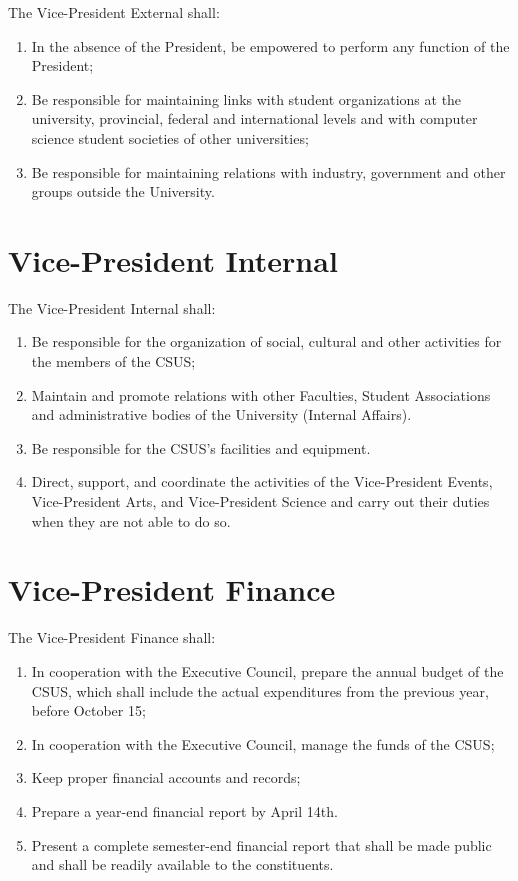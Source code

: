 The Vice-President External shall:

\begin{enumerate}
\def\labelenumi{\arabic{enumi}.}
\item
  In the absence of the President, be empowered to perform any function
  of the President;
\item
  Be responsible for maintaining links with student organizations at the
  university, provincial, federal and international levels and with
  computer science student societies of other universities;
\item
  Be responsible for maintaining relations with industry, government and
  other groups outside the University.
\end{enumerate}

\section{Vice-President
Internal}\label{vice-president-internal}

The Vice-President Internal shall:

\begin{enumerate}
\def\labelenumi{\arabic{enumi}.}
\item
  Be responsible for the organization of social, cultural and other
  activities for the members of the CSUS;
\item
  Maintain and promote relations with other Faculties, Student
  Associations and administrative bodies of the University (Internal
  Affairs).
\item
  Be responsible for the CSUS's facilities and equipment.
\item
  Direct, support, and coordinate the activities of the Vice-President
  Events, Vice-President Arts, and Vice-President Science and carry out
  their duties when they are not able to do so.
\end{enumerate}

\section{Vice-President Finance}\label{vice-president-finance}

The Vice-President Finance shall:

\begin{enumerate}
\def\labelenumi{\arabic{enumi}.}
\item
  In cooperation with the Executive Council, prepare the annual budget
  of the CSUS, which shall include the actual expenditures from the
  previous year, before October 15;
\item
  In cooperation with the Executive Council, manage the funds of the
  CSUS;
\item
  Keep proper financial accounts and records;
\item
  Prepare a year-end financial report by April 14th.
\item
  Present a complete semester-end financial report that shall be made
  public and shall be readily available to the constituents.
\end{enumerate}

